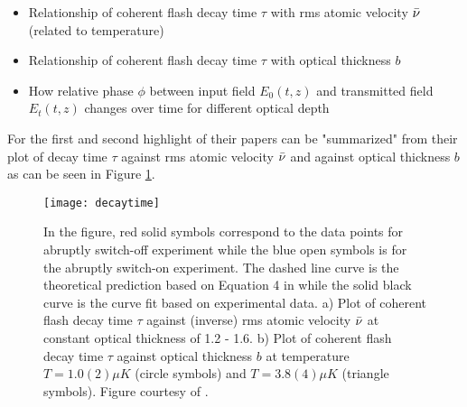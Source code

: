 \begin{itemize}
    \item Relationship of coherent flash decay time $\tau$ with rms atomic velocity $\Bar{\nu}$ (related to temperature)
    \item Relationship of coherent flash decay time $\tau$ with optical thickness $b$
    \item How relative phase $\phi$ between input field $E_{0}(t, z)$ and transmitted field $E_{t}(t, z)$ changes over time for different optical depth
\end{itemize}

For the first and second highlight of their papers can be "summarized" from their plot of decay time $\tau$ against rms atomic velocity $\Bar{\nu}$ and against optical thickness $b$ as can be seen in Figure \ref{fig: decay time}. 

\begin{figure}[h!]
    \centering
    \texttt{[image: decaytime]}
    \caption{In the figure, red solid symbols correspond to the data points for abruptly switch-off experiment while the blue open symbols is for the abruptly switch-on experiment. The dashed line curve is the theoretical prediction based on Equation 4 in \cite{Chalony2011} while the solid black curve is the curve fit based on experimental data. a) Plot of coherent flash decay time $\tau$ against (inverse) rms atomic velocity $\Bar{\nu}$ at constant optical thickness of 1.2 - 1.6. b) Plot of coherent flash decay time $\tau$ against optical thickness $b$ at temperature  $T = 1.0(2) \mu K$ (circle symbols) and $T = 3.8(4) \mu K$ (triangle symbols). Figure courtesy of \cite{Chalony2011}.}
    \label{fig: decay time}
\end{figure}

